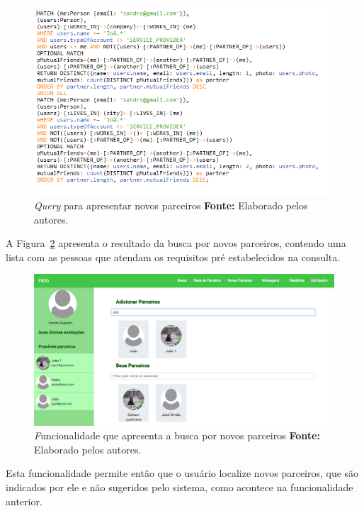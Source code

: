 \begin{figure}[h!]
	\centerline{\includegraphics[scale=0.6]{./imagens/consulta-busca-novos-parceiros.png}}
	\caption[\textit{Query} para apresentar novos parceiros.]
	{\textit{Query} para apresentar novos parceiros \textbf{Fonte:} Elaborado pelos autores.}
	\label{fig:consulta_novos_parceiros}
\end{figure}

\par A Figura~\ref{fig:busca_novos_parceiros} apresenta o resultado da busca por novos parceiros, contendo uma lista com as pessoas que atendam os requisitos pré estabelecidos na consulta.

\newpage
\begin{figure}[h!]
	\centerline{\includegraphics[scale=0.4]{./imagens/busca-novos-parceiros.png}}
	\caption[\textit Funcionalidade que apresenta a busca por novos parceiros]
	{\textit Funcionalidade que apresenta a busca por novos parceiros \textbf{Fonte:} Elaborado pelos autores.}
	\label{fig:busca_novos_parceiros}
\end{figure}

\par  Esta funcionalidade permite então que o usuário localize novos parceiros, que são indicados por ele e não sugeridos pelo sistema, como acontece na funcionalidade anterior.
